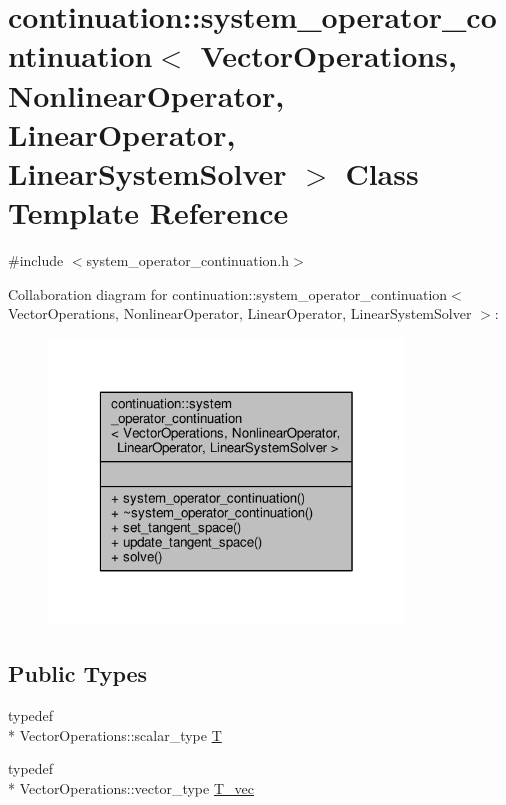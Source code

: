\hypertarget{classcontinuation_1_1system__operator__continuation}{\section{continuation\-:\-:system\-\_\-operator\-\_\-continuation$<$ Vector\-Operations, Nonlinear\-Operator, Linear\-Operator, Linear\-System\-Solver $>$ Class Template Reference}
\label{classcontinuation_1_1system__operator__continuation}
}


{\ttfamily \#include $<$system\-\_\-operator\-\_\-continuation.\-h$>$}



Collaboration diagram for continuation\-:\-:system\-\_\-operator\-\_\-continuation$<$ Vector\-Operations, Nonlinear\-Operator, Linear\-Operator, Linear\-System\-Solver $>$\-:\nopagebreak
\begin{figure}[H]
\begin{center}
\leavevmode
\includegraphics[width=268pt]{classcontinuation_1_1system__operator__continuation__coll__graph}
\end{center}
\end{figure}
\subsection*{Public Types}
\begin{DoxyCompactItemize}
\item 
typedef \\*
Vector\-Operations\-::scalar\-\_\-type \hyperlink{classcontinuation_1_1system__operator__continuation_a56f40eb91ed7d8435aac8fa97d7ebdf1}{T}
\item 
typedef \\*
Vector\-Operations\-::vector\-\_\-type \hyperlink{classcontinuation_1_1system__operator__continuation_a429826adb9f5e048cc54fc0d2a871080}{T\-\_\-vec}
\end{DoxyCompactItemize}
